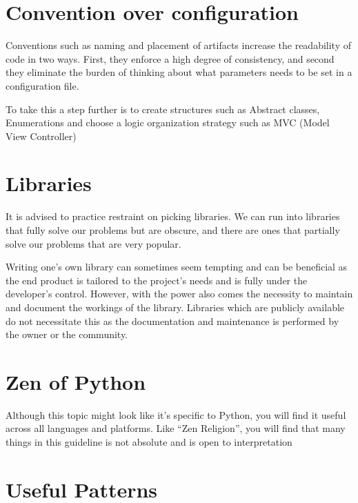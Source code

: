 \section{Convention over configuration}

Conventions such as naming and placement of artifacts increase the readability of code in two ways. First, they enforce a high degree of consistency, and second they eliminate the burden of thinking about what parameters needs to be set in a configuration file.

To take this a step further is to create structures such as Abstract classes, Enumerations and choose a logic organization strategy such as MVC (Model View Controller)

\section{Libraries}
It is advised to practice restraint on picking libraries. We can run into libraries that fully solve our problems but are obscure, and there are ones that partially solve our problems that are very popular. 

Writing one's own library can sometimes seem tempting and can be beneficial as the end product is tailored to the project's needs and is fully under the developer's control. However, with the power also comes the necessity to maintain and document the workings of the library. Libraries which are publicly available do not necessitate this as the documentation and maintenance is performed by the owner or the community.
 
\section{Zen of Python}

Although this topic might look like it’s specific to Python, you will find it useful across all languages and platforms. Like “Zen Religion”, you will find that many things in this guideline is not absolute and is open to interpretation

\begin{center}
\end{center}


\section{Useful Patterns}

